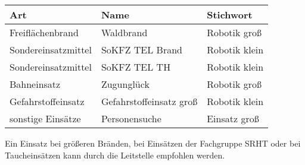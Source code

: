 \begin{table}[h]
\begin{tabular}{lll}
\textbf{Art} & \textbf{Name} & \textbf{Stichwort} \\ \hline
	Freiflächenbrand
	& Waldbrand
	& Robotik groß
\\
\rowcolor[HTML]{EFEFEF}
	Sondereinsatzmittel
	& SoKFZ TEL Brand
	& Robotik klein
\\
	Sondereinsatzmittel
	& SoKFZ TEL TH
	& Robotik klein
\\
\rowcolor[HTML]{EFEFEF}
	Bahneinsatz
	& Zugunglück
	& Robotik groß
\\
	Gefahrstoffeinsatz
	& Gefahrstoffeinsatz groß
	& Robotik klein
\\
\rowcolor[HTML]{EFEFEF}
	sonstige Einsätze
	& Personensuche
	& Einsatz groß
\\
\end{tabular}
\end{table}

\vspace*{1\baselineskip}

\noindent Ein Einsatz bei größeren Bränden, bei Einsätzen der Fachgruppe SRHT oder bei Taucheinsätzen kann durch die Leitstelle empfohlen werden.
